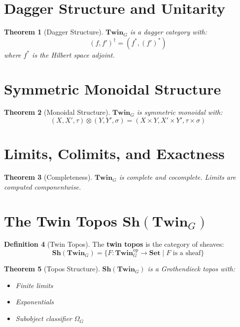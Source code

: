\documentclass[11pt,a4paper,openright]{book}
\theoremstyle{plain}
\newtheorem{theorem}{Theorem}[chapter]
\theoremstyle{definition}
\newtheorem{definition}[theorem]{Definition}
\newcommand{\op}{\mathrm{op}}
\newcommand{\Twin}{\mathbf{Twin}}
\newcommand{\Set}{\mathbf{Set}}
\newcommand{\Sh}{\mathbf{Sh}}
\begin{document}
\section{Dagger Structure and Unitarity}

\begin{theorem}[Dagger Structure]
$\Twin_G$ is a dagger category with:
\begin{equation}
(f, f')^\dagger = (f^*, (f')^*)
\end{equation}
where $f^*$ is the Hilbert space adjoint.
\end{theorem}

\section{Symmetric Monoidal Structure}

\begin{theorem}[Monoidal Structure]
$\Twin_G$ is symmetric monoidal with:
\begin{equation}
(X, X', \tau) \otimes (Y, Y', \sigma) = (X \times Y, X' \times Y', \tau \times \sigma)
\end{equation}
\end{theorem}

\section{Limits, Colimits, and Exactness}

\begin{theorem}[Completeness]
$\Twin_G$ is complete and cocomplete. Limits are computed componentwise.
\end{theorem}

\section{The Twin Topos $\Sh(\Twin_G)$}

\begin{definition}[Twin Topos]
The \textbf{twin topos} is the category of sheaves:
\begin{equation}
\Sh(\Twin_G) = \{F: \Twin_G^{\op} \to \Set \mid F \text{ is a sheaf}\}
\end{equation}
\end{definition}

\begin{theorem}[Topos Structure]
$\Sh(\Twin_G)$ is a Grothendieck topos with:
\begin{itemize}
    \item Finite limits
    \item Exponentials
    \item Subobject classifier $\Omega_G$
\end{itemize}
\end{theorem}
\end{document}
